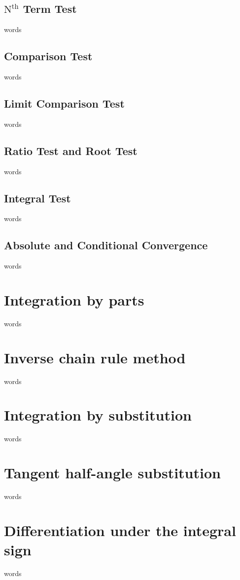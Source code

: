 \subsection{$\textrm{N}^{\textrm{th}}$ Term Test}
words

\subsection{Comparison Test}
words

\subsection{Limit Comparison Test}
words

\subsection{Ratio Test and Root Test}
words

\subsection{Integral Test}
words

\subsection{Absolute and Conditional Convergence}
words



\section{Integration by parts}
words

\section{Inverse chain rule method}
words

\section{Integration by substitution}
words

\section{Tangent half-angle substitution}
words

\section{Differentiation under the integral sign}
words

